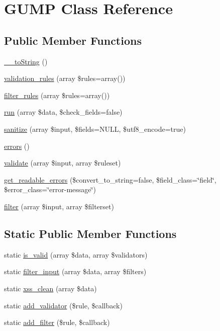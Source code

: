 \hypertarget{class_g_u_m_p}{\section{G\-U\-M\-P Class Reference}
\label{class_g_u_m_p}
}
\subsection*{Public Member Functions}
\begin{DoxyCompactItemize}
\item 
\hyperlink{class_g_u_m_p_a7516ca30af0db3cdbf9a7739b48ce91d}{\-\_\-\-\_\-to\-String} ()
\item 
\hyperlink{class_g_u_m_p_a354d3acca966ef3024c232c5407be5b3}{validation\-\_\-rules} (array \$rules=array())
\item 
\hyperlink{class_g_u_m_p_a2bd0648ee20d7e3ea6724aca14b13688}{filter\-\_\-rules} (array \$rules=array())
\item 
\hyperlink{class_g_u_m_p_a20339b554173f073411416cfe873bd2f}{run} (array \$data, \$check\-\_\-fields=false)
\item 
\hyperlink{class_g_u_m_p_ae55245a7180563ac0eabf7d2552280dc}{sanitize} (array \$input, \$fields=N\-U\-L\-L, \$utf8\-\_\-encode=true)
\item 
\hyperlink{class_g_u_m_p_adab0d6dea21cca5e7097732c8a33b8a5}{errors} ()
\item 
\hyperlink{class_g_u_m_p_afd88d3b44353ca2e3d0e2098272b2f3d}{validate} (array \$input, array \$ruleset)
\item 
\hyperlink{class_g_u_m_p_a1a958b3553dca2bf4e0e29b66c7c6b2d}{get\-\_\-readable\-\_\-errors} (\$convert\-\_\-to\-\_\-string=false, \$field\-\_\-class=\char`\"{}field\char`\"{}, \$error\-\_\-class=\char`\"{}error-\/message\char`\"{})
\item 
\hyperlink{class_g_u_m_p_ae620ae79028fbb2399ff6db7b61cf12c}{filter} (array \$input, array \$filterset)
\end{DoxyCompactItemize}
\subsection*{Static Public Member Functions}
\begin{DoxyCompactItemize}
\item 
static \hyperlink{class_g_u_m_p_a1608cd606864586829918c70548b531c}{is\-\_\-valid} (array \$data, array \$validators)
\item 
static \hyperlink{class_g_u_m_p_a35f9134929dd4ce61ac865324fa868d3}{filter\-\_\-input} (array \$data, array \$filters)
\item 
static \hyperlink{class_g_u_m_p_adb599644af08c8de6f4421138d92ade8}{xss\-\_\-clean} (array \$data)
\item 
static \hyperlink{class_g_u_m_p_a07f63e88d5bce265215d0559dbe22f72}{add\-\_\-validator} (\$rule, \$callback)
\item 
static \hyperlink{class_g_u_m_p_a77515383df8e2a43b5e9e55051c54369}{add\-\_\-filter} (\$rule, \$callback)
\end{DoxyCompactItemize}
